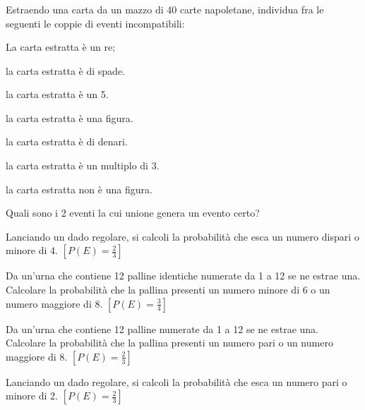 \subsubsection*{}
\begin{esercizio}
 \label{ese:9.4}
Estraendo una carta da un mazzo di 40 carte napoletane, individua fra le 
seguenti le coppie di eventi incompatibili:
\begin{multicols}{2}
\begin{enumeratea}
\item La carta estratta è un re;
\item la carta estratta è di spade.
\item la carta estratta è un 5.
\item la carta estratta è una figura.
\item la carta estratta è di denari.
\item la carta estratta è un multiplo di 3.
\item la carta estratta non è una figura.
\end{enumeratea}
\end{multicols}
Quali sono i 2 eventi la cui unione genera un evento certo?
\end{esercizio}

\begin{esercizio}[\Ast]
 \label{ese:9.28}
 Lanciando un dado regolare, si calcoli la probabilità che esca un numero 
dispari o minore di 4.
\hfill $\left[P(E)=\frac 2 3\right]$
\end{esercizio}

\begin{esercizio}[\Ast]
 \label{ese:9.29}
Da un'urna che contiene 12 palline identiche numerate da 1 a 12 se ne estrae 
una. Calcolare la probabilità che la pallina presenti un numero minore di 6 o un 
numero maggiore di 8.
\hfill $\left[P(E)=\frac 3 4\right]$
\end{esercizio}

\begin{esercizio}[\Ast]
 \label{ese:9.30}
Da un'urna che contiene 12 palline numerate da 1 a 12 se ne estrae una. 
Calcolare la probabilità che la pallina presenti un numero pari o un numero 
maggiore di 8.
\hfill $\left[P(E)=\frac 2 3\right]$
\end{esercizio}

\begin{esercizio}[\Ast]
 \label{ese:9.31}
Lanciando un dado regolare, si calcoli la probabilità che esca un numero pari o 
minore di 2.
\hfill $\left[P(E)=\frac 2 3\right]$
\end{esercizio}

